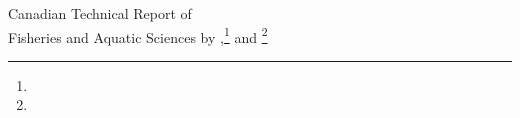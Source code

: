 \normalsize
{}
\thispagestyle{empty}
\noindent
\begin{center}
Canadian Technical Report of\\
Fisheries and Aquatic Sciences \trReportNum{}
\vfill
\trYear{}
\vfill
\MakeTextUppercase{\trTitle{}}
\vfill
by
\vfill
\trAuthALong{},\footnote{\trAuthADetails{}} and \trAuthBLong{}\footnote{\trAuthBDetails{}}
\vfill
\trAddy{}
\end{center}
\clearpage
